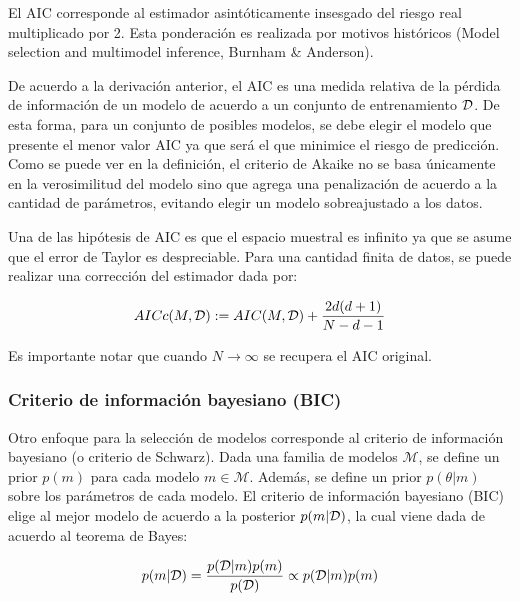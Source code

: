 \begin{remark}
El AIC corresponde al estimador asintóticamente insesgado del riesgo real multiplicado por 2. Esta ponderación es realizada por motivos históricos (Model selection and multimodel inference, Burnham \& Anderson).
\end{remark}

De acuerdo a la derivación anterior, el AIC es una medida relativa de la pérdida de información de un modelo de acuerdo a un conjunto de entrenamiento ${\mathcal D}$. De esta forma, para un conjunto de posibles modelos, se debe elegir el modelo que presente el menor valor AIC ya que será el que minimice el riesgo de predicción.\\

Como se puede ver en la definición, el criterio de Akaike no se basa únicamente en la verosimilitud del modelo sino que agrega una penalización de acuerdo a la cantidad de parámetros, evitando elegir un modelo sobreajustado a los datos. 

\begin{remark}
	Una de las hipótesis de AIC es que el espacio muestral es infinito ya que se asume que el error de Taylor es despreciable. Para una cantidad finita de datos, se puede realizar una corrección del estimador dada por:
	
	\begin{equation}
		AICc(M,{\mathcal D}) := AIC(M,{\mathcal D}) + \frac{2d(d+1)}{N-d-1}
	\end{equation}
	
	Es importante notar que cuando $N\to\infty$ se recupera el AIC original.
\end{remark}

\subsubsection{Criterio de información bayesiano (BIC)}

Otro enfoque para la selección de modelos corresponde al criterio de información bayesiano (o criterio de Schwarz). Dada una familia de modelos $\mathcal{M}$, se define un prior $p(m)$ para cada modelo $m\in\mathcal{M}$. Además, se define un prior $p(\theta|m)$ sobre los parámetros de cada modelo. El criterio de información bayesiano (BIC) elige al mejor modelo de acuerdo a la posterior $p(m|{\mathcal D})$, la cual viene dada de acuerdo al teorema de Bayes:

\begin{equation}
	p(m|{\mathcal D})=\frac{p({\mathcal D}|m)p(m)}{p({\mathcal D})}\propto p({\mathcal D}|m)p(m)
\end{equation}

